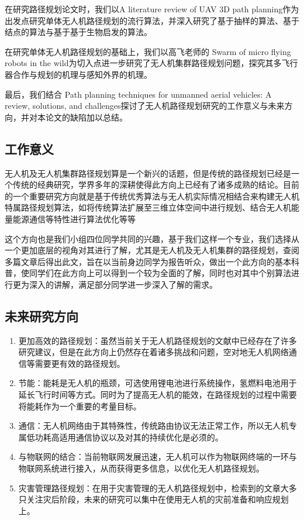 \documentclass[conference]{IEEEtran}
\begin{document}
在研究路径规划论文时，我们以A literature review of UAV 3D path planning\cite{无人机路径规划综述}作为出发点研究单体无人机路径规划的流行算法，并深入研究了基于抽样的算法、基于结点的算法与基于基于生物启发的算法。

在研究单体无人机路径规划的基础上，我们以高飞老师的 Swarm of micro flying robots in the wild\cite{集群路径规划}为切入点进一步研究了无人机集群路径规划问题，探究其多飞行器合作与规划的机理与感知外界的机理。

最后，我们结合 Path planning techniques for unmanned aerial vehicles: A review, solutions, and challenges\cite{未来研究方向}探讨了无人机路径规划研究的工作意义与未来方向，并对本论文的缺陷加以总结。


\subsection{工作意义}%

无人机及无人机集群路径规划算是一个新兴的话题，但是传统的路径规划已经是一个传统的经典研究，学界多年的深耕使得此方向上已经有了诸多成熟的结论。目前的一个重要研究方向就是基于传统优秀算法与无人机实际情况相结合来构建无人机特属路径规划算法，如将传统算法扩展至三维立体空间中进行规划、结合无人机能量能源通信等特性进行算法优化等等

这个方向也是我们小组四位同学共同的兴趣，基于我们这样一个专业，我们选择从一个更加底层的视角对其进行了解，尤其是无人机及无人机集群的路径规划，查阅多篇文章后得出此文，旨在以当前身边同学为报告听众，做出一个此方向的基本科普，使同学们在此方向上可以得到一个较为全面的了解，同时也对其中个别算法进行更为深入的讲解，满足部分同学进一步深入了解的需求。


\subsection{未来研究方向}%

\begin{enumerate}
    \item 更加高效的路径规划：虽然当前关于无人机路径规划的文献中已经存在了许多研究建议，但是在此方向上仍然存在着诸多挑战和问题，空对地无人机网络通信等需要更有效的路径规划。
    \item 节能：能耗是无人机的瓶颈，可选使用锂电池进行系统操作，氢燃料电池用于延长飞行时间等方式。同时为了提高无人机的能效，在路径规划的过程中需要将能耗作为一个重要的考量目标。
    \item 通信：无人机网络由于其特殊性，传统路由协议无法正常工作，所以无人机专属低功耗高适用通信协议以及对其的持续优化是必须的。
    \item 与物联网的结合：当前物联网发展迅速，无人机可以作为物联网终端的一环与物联网系统进行接入，从而获得更多信息，以优化无人机路径规划。
    \item 灾害管理路径规划：在用于灾害管理的无人机路径规划中，检索到的文章大多只关注灾后阶段，未来的研究可以集中在使用无人机的灾前准备和响应规划上。
\end{enumerate}
\end{document}
